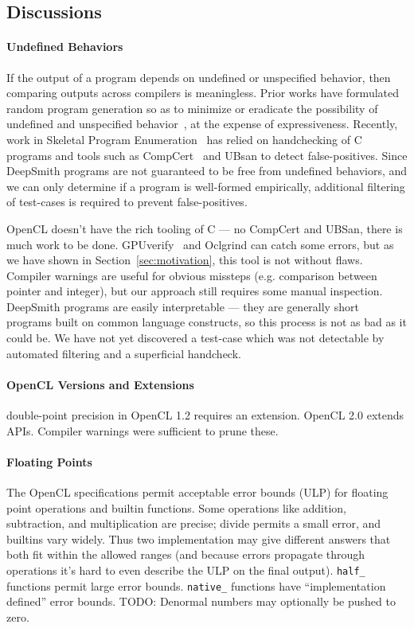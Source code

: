 \subsection{Discussions}\label{subsec:discussions}

\paragraph{Undefined Behaviors} If the output of a program depends on undefined or unspecified behavior, then comparing outputs across compilers is meaningless.  Prior works have formulated random program generation so as to minimize or eradicate the possibility of undefined and unspecified behavior~\cite{Yang2011c,Le2013a,Le2015}, at the expense of expressiveness. Recently, work in Skeletal Program Enumeration~\cite{Zhang2017a} has relied on handchecking of C programs and tools such as CompCert~\cite{Leroy2013} and UBsan to detect false-positives. Since DeepSmith programs are not guaranteed to be free from undefined behaviors, and we can only determine if a program is well-formed empirically, additional filtering of test-cases is required to prevent false-positives.

OpenCL doesn't have the rich tooling of C --- no CompCert and UBSan, there is much work to be done. GPUverify~\cite{Betts2012} and Oclgrind can catch some errors, but as we have shown in Section~\ref{sec:motivation}, this tool is not without flaws. Compiler warnings are useful for obvious missteps (e.g. comparison between pointer and integer), but our approach still requires some manual inspection. DeepSmith programs are easily interpretable --- they are generally short programs built on common language constructs, so this process is not as bad as it could be. We have not yet discovered a test-case which was not detectable by automated filtering and a superficial handcheck.

\paragraph{OpenCL Versions and Extensions} double-point precision in OpenCL 1.2 requires an extension. OpenCL 2.0 extends APIs. Compiler warnings were sufficient to prune these.

\paragraph{Floating Points} The OpenCL specifications permit acceptable error bounds (ULP) for floating point operations and builtin functions. Some operations like addition, subtraction, and multiplication are precise; divide permits a small error, and builtins vary widely. Thus two implementation may give different answers that both fit within the allowed ranges (and because errors propagate through operations it's hard to even describe the ULP on the final output). \texttt{half\_} functions permit large error bounds. \texttt{native\_} functions have ``implementation defined'' error bounds. TODO: Denormal numbers may optionally be pushed to zero.

